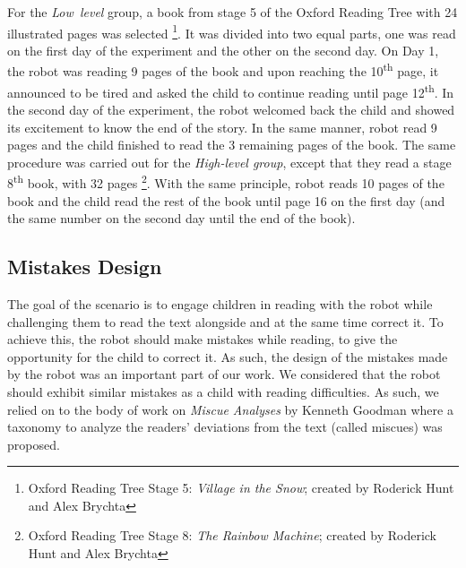 \documentclass{sigchi}
\newcommand{\ts}{\textsuperscript}
\begin{document}
For the \textit{Low~level} group, a book from stage 5 of the Oxford Reading Tree with 24 illustrated pages was selected \footnote{Oxford Reading Tree Stage 5: \textit{Village in the Snow}; created by Roderick Hunt and Alex Brychta}.
It was divided into two equal parts, one was read on the first day of the experiment and the other on the second day. 
On Day 1,  the robot was reading 9 pages of the book and upon reaching the 10\ts{th} page, it announced to be tired and asked the child to continue reading until page 12\ts{th}. 
In the second day of the experiment, the robot welcomed back the child and showed its excitement to know the end of the story. 
In the same manner, robot read 9 pages and the child finished to read the 3 remaining pages of the book. 
The same procedure was carried out for the \textit{High-level group}, except that they read a stage 8\ts{th} book, with 32 pages \footnote{Oxford Reading Tree Stage 8: \textit{The Rainbow Machine}; created by Roderick Hunt and Alex Brychta}. 
With the same principle, robot reads 10 pages of the book and the child read the rest of the book until page 16 on the first day (and the same number on the second day until the end of the book).


\subsection{Mistakes Design}

The goal of the scenario is to engage children in reading with the robot while challenging them to read the text alongside and at the same time correct it. To achieve this, the robot should make mistakes while reading, to give the opportunity for the child to correct it. As such, the design of the mistakes made by the robot was an important part of our work. 
We considered that the robot should exhibit  similar mistakes as a child with reading difficulties. As such, we relied on to the body of work on \emph{Miscue Analyses} by Kenneth Goodman \cite{goodman1969analysis,goodman1973miscue} where  a taxonomy to analyze the readers' deviations from the text (called miscues) was proposed.
\end{document}

